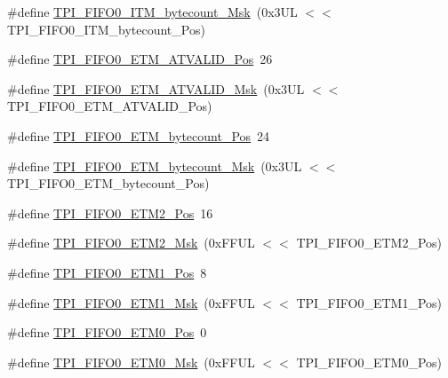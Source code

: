 \begin{DoxyCompactItemize}
\item 
\#define \mbox{\hyperlink{group___c_m_s_i_s___t_p_i_ga07bafa971b8daf0d63b3f92b9ae7fa16}{T\+P\+I\+\_\+\+F\+I\+F\+O0\+\_\+\+I\+T\+M\+\_\+bytecount\+\_\+\+Msk}}~(0x3\+U\+L $<$$<$ T\+P\+I\+\_\+\+F\+I\+F\+O0\+\_\+\+I\+T\+M\+\_\+bytecount\+\_\+\+Pos)
\item 
\#define \mbox{\hyperlink{group___c_m_s_i_s___t_p_i_ga7fdeb3e465ca4aa9e3b2f424ab3bbd1d}{T\+P\+I\+\_\+\+F\+I\+F\+O0\+\_\+\+E\+T\+M\+\_\+\+A\+T\+V\+A\+L\+I\+D\+\_\+\+Pos}}~26
\item 
\#define \mbox{\hyperlink{group___c_m_s_i_s___t_p_i_ga4f0005dc420b28f2369179a935b9a9d3}{T\+P\+I\+\_\+\+F\+I\+F\+O0\+\_\+\+E\+T\+M\+\_\+\+A\+T\+V\+A\+L\+I\+D\+\_\+\+Msk}}~(0x3\+U\+L $<$$<$ T\+P\+I\+\_\+\+F\+I\+F\+O0\+\_\+\+E\+T\+M\+\_\+\+A\+T\+V\+A\+L\+I\+D\+\_\+\+Pos)
\item 
\#define \mbox{\hyperlink{group___c_m_s_i_s___t_p_i_ga2f738e45386ebf58c4d406f578e7ddaf}{T\+P\+I\+\_\+\+F\+I\+F\+O0\+\_\+\+E\+T\+M\+\_\+bytecount\+\_\+\+Pos}}~24
\item 
\#define \mbox{\hyperlink{group___c_m_s_i_s___t_p_i_gad2536b3a935361c68453cd068640af92}{T\+P\+I\+\_\+\+F\+I\+F\+O0\+\_\+\+E\+T\+M\+\_\+bytecount\+\_\+\+Msk}}~(0x3\+U\+L $<$$<$ T\+P\+I\+\_\+\+F\+I\+F\+O0\+\_\+\+E\+T\+M\+\_\+bytecount\+\_\+\+Pos)
\item 
\#define \mbox{\hyperlink{group___c_m_s_i_s___t_p_i_ga5f0037cc80c65e86d9e94e5005077a48}{T\+P\+I\+\_\+\+F\+I\+F\+O0\+\_\+\+E\+T\+M2\+\_\+\+Pos}}~16
\item 
\#define \mbox{\hyperlink{group___c_m_s_i_s___t_p_i_gaa82a7b9b99c990fb12eafb3c84b68254}{T\+P\+I\+\_\+\+F\+I\+F\+O0\+\_\+\+E\+T\+M2\+\_\+\+Msk}}~(0x\+F\+F\+U\+L $<$$<$ T\+P\+I\+\_\+\+F\+I\+F\+O0\+\_\+\+E\+T\+M2\+\_\+\+Pos)
\item 
\#define \mbox{\hyperlink{group___c_m_s_i_s___t_p_i_gac5a2ef4b7f811d1f3d81ec919d794413}{T\+P\+I\+\_\+\+F\+I\+F\+O0\+\_\+\+E\+T\+M1\+\_\+\+Pos}}~8
\item 
\#define \mbox{\hyperlink{group___c_m_s_i_s___t_p_i_gaad9c1a6ed34a70905005a0cc14d5f01b}{T\+P\+I\+\_\+\+F\+I\+F\+O0\+\_\+\+E\+T\+M1\+\_\+\+Msk}}~(0x\+F\+F\+U\+L $<$$<$ T\+P\+I\+\_\+\+F\+I\+F\+O0\+\_\+\+E\+T\+M1\+\_\+\+Pos)
\item 
\#define \mbox{\hyperlink{group___c_m_s_i_s___t_p_i_ga48783ce3c695d8c06b1352a526110a87}{T\+P\+I\+\_\+\+F\+I\+F\+O0\+\_\+\+E\+T\+M0\+\_\+\+Pos}}~0
\item 
\#define \mbox{\hyperlink{group___c_m_s_i_s___t_p_i_gaf924f7d1662f3f6c1da12052390cb118}{T\+P\+I\+\_\+\+F\+I\+F\+O0\+\_\+\+E\+T\+M0\+\_\+\+Msk}}~(0x\+F\+F\+U\+L $<$$<$ T\+P\+I\+\_\+\+F\+I\+F\+O0\+\_\+\+E\+T\+M0\+\_\+\+Pos)

\end{DoxyCompactItemize}
